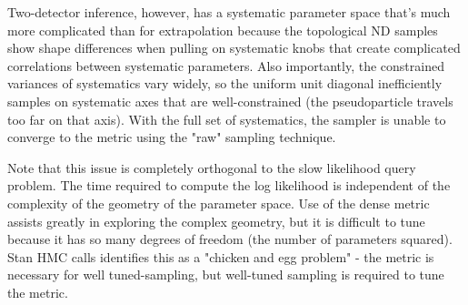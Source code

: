 \documentclass{article}
\begin{document}
Two-detector inference, however, has a systematic parameter space that's much more complicated than for extrapolation because the topological ND samples show shape differences when pulling on systematic knobs that create complicated correlations between systematic parameters. Also importantly, the constrained variances of systematics vary widely, so the uniform unit diagonal inefficiently samples on systematic axes that are well-constrained (the pseudoparticle travels too far on that axis). With the full set of systematics, the sampler is unable to converge to the metric using the "raw" sampling technique.

Note that this issue is completely orthogonal to the slow likelihood query problem. The time required to compute the log likelihood is independent of the complexity of the geometry of the parameter space. Use of the dense metric assists greatly in exploring the complex geometry, but it is difficult to tune because it has so many degrees of freedom (the number of parameters squared). Stan HMC calls identifies this as a "chicken and egg problem" - the metric is necessary for well tuned-sampling, but well-tuned sampling is required to tune the metric.
\end{document}
